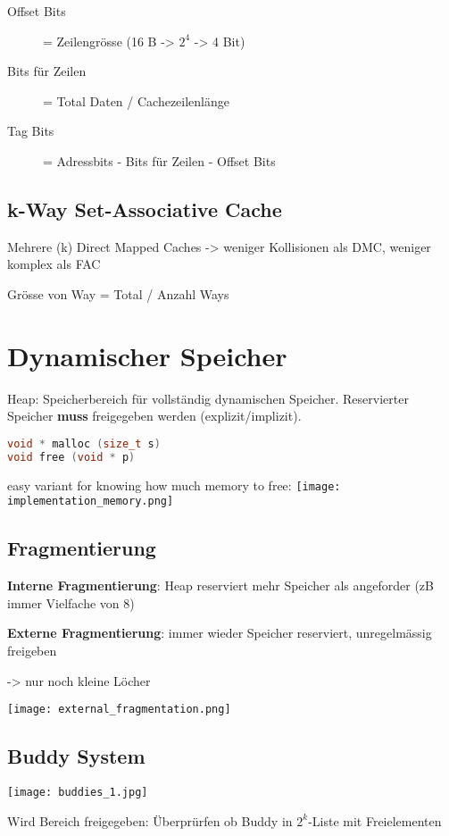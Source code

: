 \begin{multicols*}{4}
\begin{description}
    \item[Offset Bits] = Zeilengrösse (16 B -> \(2^4\) -> 4 Bit)
    \item[Bits für Zeilen] = Total Daten / Cachezeilenlänge
    \item[Tag Bits] = Adressbits - Bits für Zeilen - Offset Bits
\end{description}

\subsection{k-Way Set-Associative Cache}
Mehrere (k) Direct Mapped Caches -> weniger Kollisionen als DMC, weniger komplex als FAC

Grösse von Way = Total / Anzahl Ways

\section{Dynamischer Speicher}
Heap: Speicherbereich für vollständig dynamischen Speicher. Reservierter Speicher \textbf{muss} freigegeben werden (explizit/implizit).

\begin{lstlisting}[language=c]
void * malloc (size_t s)
void free (void * p)
\end{lstlisting}

easy variant for knowing how much memory to free:
\texttt{[image: implementation\_memory.png]}

\subsection{Fragmentierung}
\textbf{Interne Fragmentierung}: Heap reserviert mehr Speicher als angeforder (zB immer Vielfache von 8)

\textbf{Externe Fragmentierung}: immer wieder Speicher reserviert, unregelmässig freigeben

-> nur noch kleine Löcher

\texttt{[image: external\_fragmentation.png]}

\subsection{Buddy System}

\texttt{[image: buddies\_1.jpg]}

Wird Bereich freigegeben: Überprürfen ob Buddy in \(2^k\)-Liste mit Freielementen


\end{multicols*}

